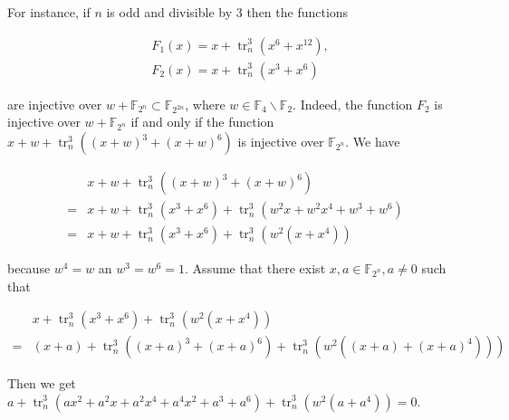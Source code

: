 \documentclass[10pt]{article}
\begin{document}
For instance, if $n$ is odd and divisible by 3 then the functions

$$
\begin{aligned}
& F_{1}(x)=x+\operatorname{tr}_{n}^{3}\left(x^{6}+x^{12}\right), \\
& F_{2}(x)=x+\operatorname{tr}_{n}^{3}\left(x^{3}+x^{6}\right)
\end{aligned}
$$

are injective over $w+\mathbb{F}_{2^{n}} \subset \mathbb{F}_{2^{2 n}}$, where $w \in \mathbb{F}_{4} \backslash \mathbb{F}_{2}$. Indeed, the function $F_{2}$ is injective over $w+\mathbb{F}_{2^{n}}$ if and only if the function $x+w+\operatorname{tr}_{n}^{3}\left((x+w)^{3}+(x+w)^{6}\right)$ is injective over $\mathbb{F}_{2^{n}}$. We have

$$
\begin{aligned}
& x+w+\operatorname{tr}_{n}^{3}\left((x+w)^{3}+(x+w)^{6}\right) \\
= & x+w+\operatorname{tr}_{n}^{3}\left(x^{3}+x^{6}\right)+\operatorname{tr}_{n}^{3}\left(w^{2} x+w^{2} x^{4}+w^{3}+w^{6}\right) \\
= & x+w+\operatorname{tr}_{n}^{3}\left(x^{3}+x^{6}\right)+\operatorname{tr}_{n}^{3}\left(w^{2}\left(x+x^{4}\right)\right)
\end{aligned}
$$

because $w^{4}=w$ an $w^{3}=w^{6}=1$. Assume that there exist $x, a \in \mathbb{F}_{2^{n}}, a \neq 0$ such that

$$
\begin{aligned}
& x+\operatorname{tr}_{n}^{3}\left(x^{3}+x^{6}\right)+\operatorname{tr}_{n}^{3}\left(w^{2}\left(x+x^{4}\right)\right) \\
= & \left.(x+a)+\operatorname{tr}_{n}^{3}\left((x+a)^{3}+(x+a)^{6}\right)+\operatorname{tr}_{n}^{3}\left(w^{2}\left((x+a)+(x+a)^{4}\right)\right)\right)
\end{aligned}
$$

Then we get\\
$a+\operatorname{tr}_{n}^{3}\left(a x^{2}+a^{2} x+a^{2} x^{4}+a^{4} x^{2}+a^{3}+a^{6}\right)+\operatorname{tr}_{n}^{3}\left(w^{2}\left(a+a^{4}\right)\right)=0$.
\end{document}
